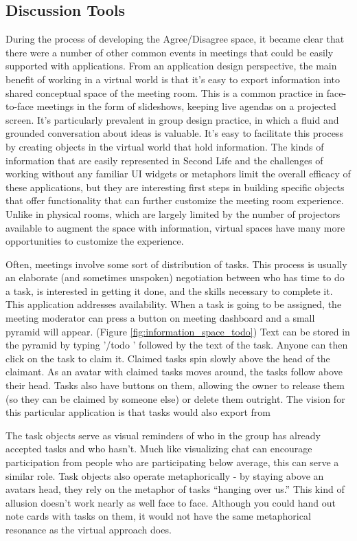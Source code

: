 \subsection{Discussion Tools}

During the process of developing the Agree/Disagree space, it became clear that there were a number of other common events in meetings that could be easily supported with applications. From an application design perspective, the main benefit of working in a virtual world is that it's easy to export information into shared conceptual space of the meeting room. This is a common practice in face-to-face meetings in the form of slideshows, keeping live agendas on a projected screen. It's particularly prevalent in group design practice, in which a fluid and grounded conversation about ideas is valuable. \citep{Dwyer:2005uj} It's easy to facilitate this process by creating objects in the virtual world that hold information. The kinds of information that are easily represented in Second Life and the challenges of working without any familiar UI widgets or metaphors limit the overall efficacy of these applications, but they are interesting first steps in building specific objects that offer functionality that can further customize the meeting room experience. Unlike in physical rooms, which are largely limited by the number of projectors available to augment the space with information, virtual spaces have many more opportunities to customize the experience.

Often, meetings involve some sort of distribution of tasks. This process is usually an elaborate (and sometimes unspoken) negotiation between who has time to do a task, is interested in getting it done, and the skills necessary to complete it. This application addresses availability. When a task is going to be assigned, the meeting moderator can press a button on meeting dashboard and a small pyramid will appear. (Figure \ref{fig:information_space_todo}) Text can be stored in the pyramid by typing '/todo ' followed by the text of the task. Anyone can then click on the task to claim it. Claimed tasks spin slowly above the head of the claimant. As an avatar with claimed tasks moves around, the tasks follow above their head. Tasks also have buttons on them, allowing the owner to release them (so they can be claimed by someone else) or delete them outright. The vision for this particular application is that tasks would also export from

The task objects serve as visual reminders of who in the group has already accepted tasks and who hasn't. Much like visualizing chat can encourage participation from people who are participating below average, this can serve a similar role. Task objects also operate metaphorically - by staying above an avatars head, they rely on the metaphor of tasks ``hanging over us.'' \citep{lakoff_metaphors_1980} This kind of allusion doesn't work nearly as well face to face. Although you could hand out note cards with tasks on them, it would not have the same metaphorical resonance as the virtual approach does.



